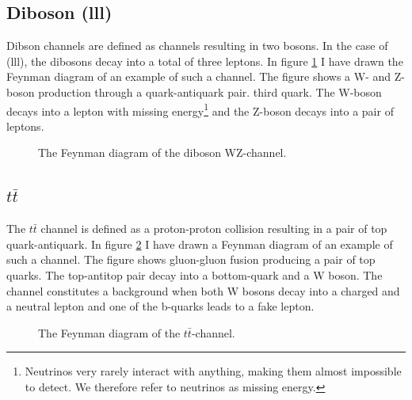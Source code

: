 \subsection{Diboson (lll)}
Dibson channels are defined as channels resulting in two bosons. In the case of (lll), the dibosons
decay into a total of three leptons. In figure \ref{fig:wz} I have drawn the Feynman diagram of an 
example of such a channel. The figure shows a W- and Z-boson production through a quark-antiquark pair.
third quark. The W-boson decays into a lepton with missing energy\footnote{Neutrinos very rarely interact
with anything, making them almost impossible to detect. We therefore refer to neutrinos as missing energy.}
and the Z-boson decays into a pair of leptons. 
\begin{figure}
    \centering
    \caption{The Feynman diagram of the diboson WZ-channel.}
    \label{fig:wz}
\end{figure}
\subsection{$t\bar{t}$}
The $t\bar{t}$ channel is defined as a proton-proton collision resulting in a pair of top quark-antiquark. 
In figure \ref{fig:ttbar} I have drawn a Feynman diagram of an example of such a channel. The figure 
shows gluon-gluon fusion producing a pair of top quarks. The top-antitop pair decay into a bottom-quark 
and a W boson. The channel constitutes a background when both W bosons decay into a charged and a neutral 
lepton and one of the b-quarks leads to a fake lepton.
\begin{figure}
    \centering
    \caption{The Feynman diagram of the $t\bar{t}$-channel.}
    \label{fig:ttbar}
\end{figure}

